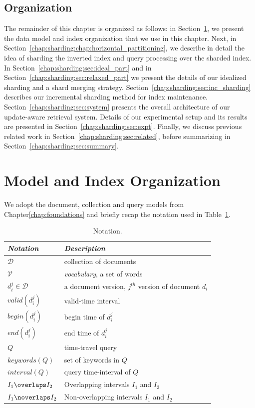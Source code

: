 \subsection{Organization}
The remainder of this chapter is organized as follows: in
Section~\ref{chap:sharding:sec:model}, we present the data model 
and index organization that we use in this chapter. Next, in 
Section~\ref{chap:sharding:chap:horizontal_partitioning}, we describe in detail the idea of 
sharding the inverted index and query processing over the sharded 
index. In Section~\ref{chap:sharding:sec:ideal_part} and in 
Section~\ref{chap:sharding:sec:relaxed_part} we present the details of our idealized sharding and 
a shard merging strategy. 
Section~\ref{chap:sharding:sec:inc_sharding} describes our incremental sharding method for 
index maintenance. Section~\ref{chap:sharding:sec:system} presents the overall 
architecture of our update-aware retrieval system. Details of our 
experimental setup and its results are presented in Section~\ref{chap:sharding:sec:expt}. 
Finally, we discuss previous related work in Section~\ref{chap:sharding:sec:related}, 
before summarizing in Section~\ref{chap:sharding:sec:summary}.


\section{Model and Index Organization}
\label{chap:sharding:sec:model}
We adopt the document, collection and query models from Chapter\ref{chap:foundations} and briefly recap the notation used in Table~\ref{tab:sharding_notation}.

\begin{table}
\centering
\begin{tabular}{ll}
\hline  
\multicolumn{1}{l}{\emph{Notation}} &  \multicolumn{1}{l}{\emph{Description}} \\
\hline
$\mathcal{D}$ & collection of documents\\
$\mathcal{V}$ & \emph{vocabulary}, a set of words\\
$d_i^j \in \mathcal{D}$ & a document version, $j^{th}$ version of document $d_i$\\
$valid(d_i^j)$ & valid-time interval \\ 
$begin(d_i^j)$ & begin time of $d_i^j$  \\
$end(d_i^j)$ & end time of $d_i^j$ \\
$Q$ & time-travel query\\
$keywords(Q)$ & set of keywords in $Q$\\
$interval(Q)$ & query time-interval of $Q$\\
$I_1 \overlaps I_2$ & Overlapping intervals $I_1$ and $I_2$ \\
$I_1 \noverlaps I_2$ & Non-overlapping intervals $I_1$ and $I_2$ \\
\hline
\end{tabular}
\caption{Notation.}
\label{tab:sharding_notation}
\end{table}

